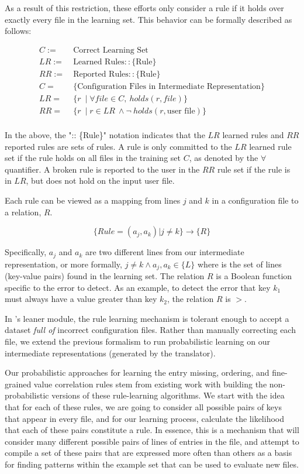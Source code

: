 As a result of this restriction, 
these efforts only consider a rule if it holds over exactly every file in 
the learning set. This behavior can be formally described as follows:
\begin{small}
\begin{align*}
C :=&\ \text{Correct Learning Set}\\
LR :=&\ \text{Learned Rules} :: \{\textrm{Rule}\}\\
RR :=&\ \text{Reported Rules} :: \{\textrm{Rule}\}\\ 
C =&\ \text{\{Configuration Files in Intermediate Representation\}}\\
LR =&\ \{ r\ \mid \forall file \in C,\ holds(r,file)\} \\
RR =&\ \{ r\ \mid r \in LR \ \land \neg\ holds(r,\textrm{user file}) \}\\
\end{align*}
\end{small}
In the above, the ":: \{Rule\}" notation indicates that the $LR$ learned rules 
and $RR$ reported rules are sets of rules.
A rule is only committed to the $LR$ learned rule set if 
the rule holds on all files in the training set $C$, as denoted by the $\forall$ quantifier. 
A broken rule is reported to the user in the $RR$ rule set if the rule is in $LR$, 
but does not hold on the input user file.

Each rule can be viewed as a mapping from 
lines $j$ and $k$ in a configuration file to a relation, $R$.

\[
\{ Rule = (a_j, a_k) | j \neq k \} \rightarrow \{ R \}
\]

Specifically, $a_j$ and $a_k$ are two different lines from our
intermediate representation, or more formally, $j \neq k \land
a_j, a_k \in \{ L \}$ where is the set of lines (key-value pairs) found
in the learning set. The relation $R$
is a Boolean function specific to the error to detect. 
As an example, to detect the error that key $k_1$ must always 
have a value greater than key $k_2$, the relation $R$ is $>$.

In \app's leaner module, the rule learning mechanism is tolerant 
enough to accept a dataset {\em full of} incorrect configuration files.
Rather than manually correcting each file, 
we extend the previous formalism to run probabilistic learning
on our intermediate representations (generated by the translator). 

Our probabilistic approaches for learning the entry missing, 
ordering, and fine-grained value correlation rules stem 
from existing work with building 
the non-probabilistic versions of these rule-learning algorithms. 
We start with the idea that for each of these rules, 
we are going to consider all possible pairs of keys that appear in every 
file, and for our learning process, calculate the likelihood that each of 
these pairs constitute a rule. 
In essence, this is a mechanism that will consider many different possible 
pairs of lines of entries in the file, 
and attempt to compile a set of these pairs 
that are expressed more often than others as a basis for finding patterns 
within the example set that can be used to evaluate new files.

